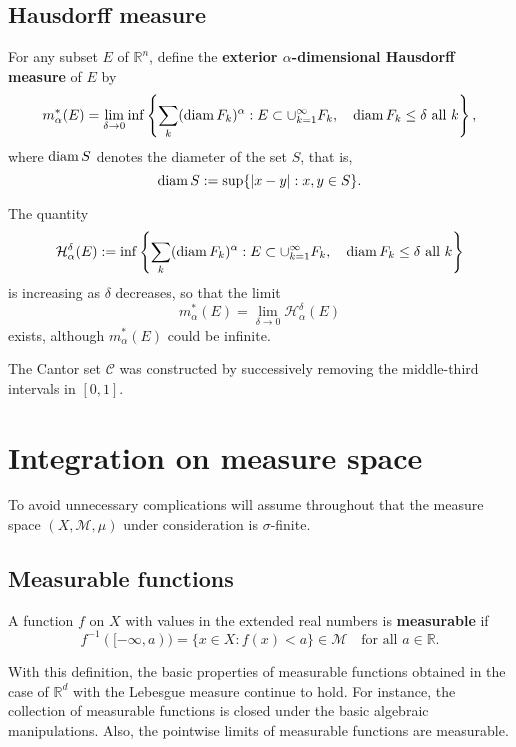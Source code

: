 \subsection{Hausdorff measure}

\begin{definition}
  For any subset $E$ of $\mathbb R^n$, 
  define the \textbf{exterior $\alpha$-dimensional Hausdorff measure} of $E$ by 
  \[
  m^*_\alpha(E) = \lim_{\delta\to0}\inf\left\{\sum_k(\operatorname*{diam} F_k)^\alpha : E\subset\cup_{k=1}^\infty F_k,
  \quad \operatorname*{diam} F_k \leq \delta \text{ all } k\right\},
  \]
  where $\operatorname*{diam} S$ denotes the diameter of the set $S$, that is, 
  \[
  \operatorname*{diam} S := \sup\{|x-y|: x,y\in S\}.
  \]
\end{definition}

\begin{remark}
  The quantity 
  \[
  \mathcal{H}_\alpha^\delta(E) :=  \inf\left\{\sum_k(\operatorname*{diam} F_k)^\alpha : E\subset\cup_{k=1}^\infty F_k,
  \quad \operatorname*{diam} F_k \leq \delta \text{ all } k\right\}
  \]
  is increasing as $\delta$ decreases, so that the limit 
  \[
  m_\alpha^*(E) = \lim_{\delta\to0}\mathcal H_\alpha^\delta(E)
  \]
  exists,
  although $m_\alpha^*(E)$ could be infinite.
\end{remark}

The Cantor set $\mathcal C$ was constructed by successively removing the middle-third intervals in $[0,1]$.

\section{Integration on measure space}

To avoid unnecessary complications will assume throughout that the measure space $(X,\mathcal M,\mu)$ under consideration is $\sigma$-finite.

\subsection{Measurable functions}

\begin{definition}
  A function $f$ on $X$ with values in the extended real numbers is \textbf{measurable} if 
  \[
  f^{-1}([-\infty, a)) = \{x\in X: f(x) < a\}\in\mathcal{M}\quad \text{for all } a\in\mathbb R.
  \]
\end{definition}

\begin{remark}
  With this definition, the basic properties of measurable functions obtained in the case of $\mathbb R^d$
  with the Lebesgue measure continue to hold.
  For instance, the collection of measurable functions is closed under the basic algebraic manipulations.
  Also, the pointwise limits of measurable functions are measurable.
\end{remark}

